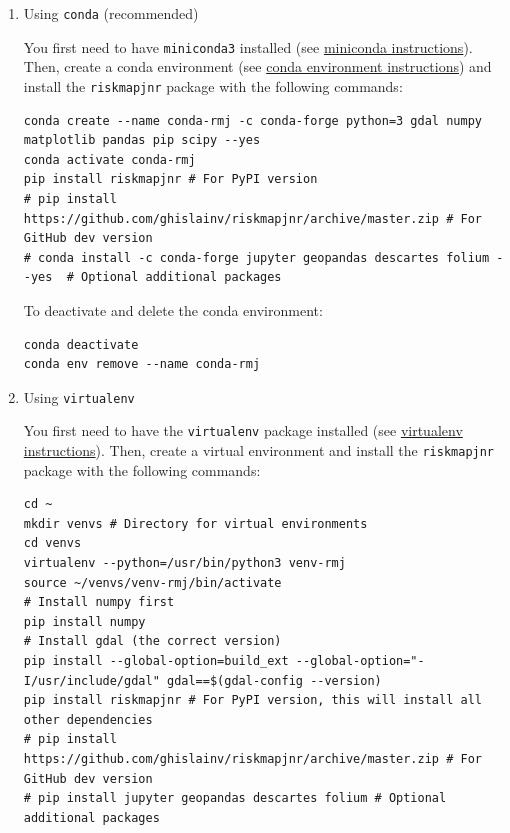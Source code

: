\documentclass[paper=a4, 12pt, DIV=12]{scrartcl}
\begin{document}
\begin{enumerate}
\item Using \texttt{conda} (recommended)
\label{sec:orgcd50847}

You first need to have \texttt{miniconda3} installed (see \href{https://docs.conda.io/en/latest/miniconda.html}{miniconda instructions}). Then, create a conda environment (see \href{https://docs.conda.io/projects/conda/en/latest/user-guide/tasks/manage-environments.html}{conda environment instructions}) and install the \texttt{riskmapjnr} package with the following commands:

\begin{verbatim}
conda create --name conda-rmj -c conda-forge python=3 gdal numpy matplotlib pandas pip scipy --yes
conda activate conda-rmj
pip install riskmapjnr # For PyPI version
# pip install https://github.com/ghislainv/riskmapjnr/archive/master.zip # For GitHub dev version
# conda install -c conda-forge jupyter geopandas descartes folium --yes  # Optional additional packages
\end{verbatim}

To deactivate and delete the conda environment:

\begin{verbatim}
conda deactivate
conda env remove --name conda-rmj
\end{verbatim}

\item Using \texttt{virtualenv}
\label{sec:org5d4cc00}

You first need to have the \texttt{virtualenv} package installed (see \href{https://packaging.python.org/guides/installing-using-pip-and-virtual-environments/}{virtualenv instructions}). Then, create a virtual environment and install the \texttt{riskmapjnr} package with the following commands:

\begin{verbatim}
cd ~
mkdir venvs # Directory for virtual environments
cd venvs
virtualenv --python=/usr/bin/python3 venv-rmj
source ~/venvs/venv-rmj/bin/activate
# Install numpy first
pip install numpy
# Install gdal (the correct version) 
pip install --global-option=build_ext --global-option="-I/usr/include/gdal" gdal==$(gdal-config --version)
pip install riskmapjnr # For PyPI version, this will install all other dependencies
# pip install https://github.com/ghislainv/riskmapjnr/archive/master.zip # For GitHub dev version
# pip install jupyter geopandas descartes folium # Optional additional packages
\end{verbatim}


\end{enumerate}
\end{document}
